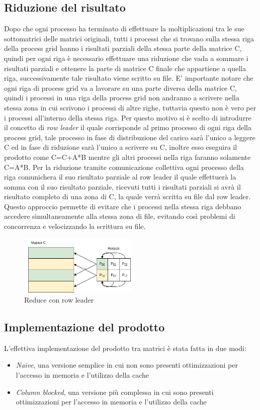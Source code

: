 \documentclass[conference]{IEEEtran}
\begin{document}
\subsection{Riduzione del risultato}
Dopo che ogni processo ha terminato di effettuare la moltiplicazioni tra le sue sottomatrici delle matrici originali, tutti i processi che si trovano sulla stessa riga della process grid hanno i risultati parziali della stessa parte della matrice C, quindi per ogni riga è necessario effettuare una riduzione che vada a sommare i risultati parziali e ottenere la parte di matrice C finale che appartiene a quella riga, successivamente tale risultato viene scritto su file. E' importante notare che ogni riga di process grid va a lavorare su una parte diversa della matrice C, quindi i processi in una riga della process grid non andranno a scrivere nella stessa zona in cui scrivono i processi di altre righe, tuttavia questo non è vero per i processi all'interno della stessa riga. Per questo motivo si è scelto di introdurre il concetto di \textit{row leader} il quale corrisponde al primo processo di ogni riga della process grid, tale processo in fase di distribuzione del carico sarà l'unico a leggere C ed in fase di riduzione sarà l'unico a scrivere su C, inoltre esso eseguira il prodotto come C=C+A*B mentre gli altri processi nella riga faranno solamente C=A*B. Per la riduzione tramite comunicazione collettiva ogni processo della riga comunichera il suo risultato parziale al row leader il quale effettuerà la somma con il suo risultato parziale, ricevuti tutti i risultati parziali si avrà il risultato completo di una zona di C, la quale verrà scritta su file dal row leader. Questo approccio permette di evitare che i processi nella stessa riga debbano accedere simultaneamente alla stessa zona di file, evitando così problemi di concorrenza e velocizzando la scrittura su file.\\
\begin{figure}[h]
    \centering
    \includegraphics[width=0.5\textwidth]{resources/reduce.png}
    \caption{Reduce con row leader}
    \label{fig:row_leader_reduce}
\end{figure}
\subsection{Implementazione del prodotto}
L'effettiva implementazione del prodotto tra matrici è stata fatta in due modi:
\begin{itemize}
    \item \textit{Naive}, una versione semplice in cui non sono presenti ottimizzazioni per l'accesso in memoria e l'utilizzo della cache
    \item \textit{Column blocked}, una versione più complessa in cui sono presenti ottimizzazioni per l'accesso in memoria e l'utilizzo della cache
\end{itemize}
\end{document}
